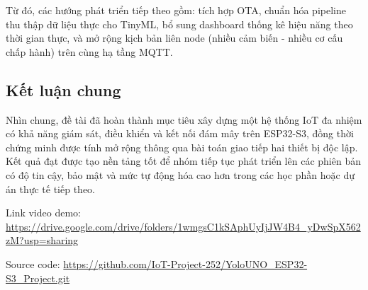 Từ đó, các hướng phát triển tiếp theo gồm: tích hợp OTA, chuẩn hóa pipeline thu thập dữ liệu thực cho TinyML, bổ sung dashboard thống kê hiệu năng theo thời gian thực, và mở rộng kịch bản liên node (nhiều cảm biến - nhiều cơ cấu chấp hành) trên cùng hạ tầng MQTT.

\subsection{Kết luận chung}

Nhìn chung, đề tài đã hoàn thành mục tiêu xây dựng một hệ thống IoT đa nhiệm có khả năng giám sát, điều khiển và kết nối đám mây trên ESP32-S3, đồng thời chứng minh được tính mở rộng thông qua bài toán giao tiếp hai thiết bị độc lập. Kết quả đạt được tạo nền tảng tốt để nhóm tiếp tục phát triển lên các phiên bản có độ tin cậy, bảo mật và mức tự động hóa cao hơn trong các học phần hoặc dự án thực tế tiếp theo.

Link video demo: \url{https://drive.google.com/drive/folders/1wmgsC1kSAphUyIjJW4B4_yDwSpX562zM?usp=sharing}

Source code: \url{https://github.com/IoT-Project-252/YoloUNO_ESP32-S3_Project.git}